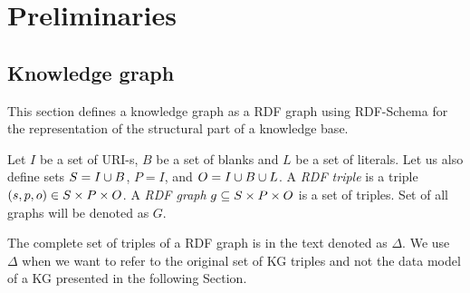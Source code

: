\documentclass[runningheads]{llncs}
\newcommand{\notes}[1]{\noindent\begin{small}-- \emph{#1}\hfill\break\end{small}}
\begin{document}








\section{Preliminaries}


\subsection{Knowledge graph\label{sec:kg}}

This section defines a knowledge graph as a RDF graph \cite{rdf} using
RDF-Schema \cite{rdfschema} for the representation of the structural
part of a knowledge base. 

Let $I$ be a set of URI-s, $B$ be a set of blanks and $L$ be a set of
literals. Let us also define sets $S = I\cup\/B$, $P = I$, and
$O = I\cup\/B\cup\/L$. A \emph{RDF triple} is a triple
$(s,p,o)\in\/S\times\/P\times\/O$. A \emph{RDF graph}
$g\subseteq\/S\times\/P\times\/O$ is a set of triples. Set of all
graphs will be denoted as $G$.

The complete set of triples of a RDF graph is in the text denoted as
$\Delta$. We use $\Delta$ when we want to refer to the original set of
KG triples and not the data model of a KG presented in the following
Section.
\end{document}
